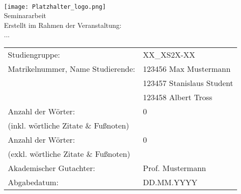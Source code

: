 \begin{center}
     \\[3ex]
    \texttt{[image: Platzhalter\_logo.png]} \\[3ex]%
    \large{Seminararbeit} \\ [-10pt]%
    \large{Erstellt im Rahmen der Veranstaltung:} \\ [-10pt]
    \large{...}
\end{center}

\begin{table}[h]
    \renewcommand{\arraystretch}{2.5}%
    \setlength{\tabcolsep}{22pt}
    \begin{tabularx}{\textwidth}{l l}
        Studiengruppe:                       & XX\_XS2X-XX               \\
        Matrikelnummer, Name Studierende:    & 123456 Max Mustermann     \\ [-15pt]
        ~                                    & 123457 Stanislaus Student \\ [-15pt]
        ~                                    & 123458 Albert Tross       \\
        Anzahl der Wörter:                   & 0                         \\ [-15pt]
        (inkl. wörtliche Zitate \& Fußnoten) & ~                         \\
        Anzahl der Wörter:                   & 0                         \\ [-15pt]
        (exkl. wörtliche Zitate \& Fußnoten) & ~                         \\
        Akademischer Gutachter:              & Prof. Mustermann          \\
        Abgabedatum:                         & DD.MM.YYYY                \\
    \end{tabularx}
\end{table}

\newpage